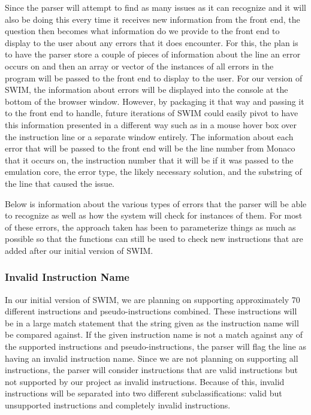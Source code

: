 \documentclass[parskip=half, fontsize=12pt]{scrartcl}
\begin{document}
Since the parser will attempt to find as many issues as it can recognize
and it will also be doing this every time it receives new information
from the front end, the question then becomes what information do we
provide to the front end to display to the user about any errors that it
does encounter. For this, the plan is to have the parser store a couple
of pieces of information about the line an error occurs on and then an
array or vector of the instances of all errors in the program will be
passed to the front end to display to the user. For our version of SWIM,
the information about errors will be displayed into the console at the
bottom of the browser window. However, by packaging it that way and
passing it to the front end to handle, future iterations of SWIM could
easily pivot to have this information presented in a different way such
as in a mouse hover box over the instruction line or a separate window
entirely. The information about each error that will be passed to the
front end will be the line number from Monaco that it occurs on, the
instruction number that it will be if it was passed to the emulation
core, the error type, the likely necessary solution, and the substring
of the line that caused the issue.

Below is information about the various types of errors that the parser
will be able to recognize as well as how the system will check for
instances of them. For most of these errors, the approach taken has been
to parameterize things as much as possible so that the functions can
still be used to check new instructions that are added after our initial
version of SWIM.

\subsubsection{Invalid Instruction Name}

In our initial version of SWIM, we are planning on supporting
approximately 70 different instructions and pseudo-instructions
combined. These instructions will be in a large match statement that the
string given as the instruction name will be compared against. If the
given instruction name is not a match against any of the supported
instructions and pseudo-instructions, the parser will flag the line as
having an invalid instruction name. Since we are not planning on
supporting all instructions, the parser will consider instructions that
are valid instructions but not supported by our project as invalid
instructions. Because of this, invalid instructions will be separated
into two different subclassifications: valid but unsupported
instructions and completely invalid instructions.
\end{document}
